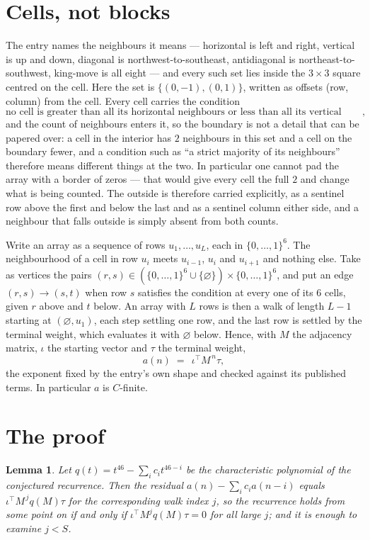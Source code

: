 \documentclass[11pt,a4paper]{article}
\theoremstyle{plain}
\newtheorem{lemma}[theorem]{Lemma}
\theoremstyle{definition}
\begin{document}
\section{Cells, not blocks}

The entry names the neighbours it means --- horizontal is left and right, vertical is up and
down, diagonal is northwest-to-southeast, antidiagonal is northeast-to-southwest, king-move is
all eight --- and every such set lies inside the $3\times3$ square centred on the cell. Here
the set is $\{(0,-1), (0,1)\}$, written as offsets (row, column) from the cell. Every cell carries
the condition
\[
\text{no cell is greater than all its horizontal neighbours or less than all its vertical neighbours},
\]
and the count of neighbours enters it, so the boundary is not a detail that can be papered
over: a cell in the interior has $2$ neighbours in this set and a cell on the boundary
fewer, and a condition such as ``a strict majority of its neighbours'' therefore means
different things at the two. In particular one cannot pad the array with a border of zeros ---
that would give every cell the full $2$ and change what is being counted. The outside is
therefore carried
explicitly, as a sentinel row above the first and below the last and as a sentinel column
either side, and a neighbour that falls outside is simply absent from both counts.

Write an array as a sequence of rows $u_1,\dots,u_L$, each in
$\{0,\dots,1\}^{6}$. The neighbourhood of a cell in row $u_i$ meets $u_{i-1}$,
$u_i$ and $u_{i+1}$ and nothing else. Take as vertices the pairs
$(r,s)\in(\{0,\dots,1\}^{6}\cup\{\varnothing\})\times\{0,\dots,1\}^{6}$,
and put an edge $(r,s)\to(s,t)$ when row $s$ satisfies the condition at every one of its
$6$ cells, given $r$ above and $t$ below. An array with $L$ rows is then a walk of length
$L-1$ starting at $(\varnothing,u_1)$, each step settling one row, and the last row is
settled by the terminal weight, which evaluates it with $\varnothing$ below. Hence,
with $M$ the adjacency matrix, $\iota$ the starting vector and $\tau$ the terminal weight,
\[
a(n)\;=\;\,\iota^{\!\top}M^{\,n}\tau ,
\]
the exponent fixed by the entry's own shape and checked against its published terms. In
particular $a$ is $C$-finite.

\section{The proof}

\begin{lemma}\label{lem:crit}
Let $q(t)=t^{46}-\sum_i c_it^{46-i}$ be the characteristic polynomial of the
conjectured recurrence. Then the residual $a(n)-\sum_ic_ia(n-i)$ equals
$\iota^{\!\top}M^{\,j}q(M)\tau$ for the corresponding walk index $j$, so the
recurrence holds from some point on if and only if $\iota^{\!\top}M^{j}q(M)\tau=0$ for all
large $j$; and it is enough to examine $j<S$.
\end{lemma}
\end{document}
